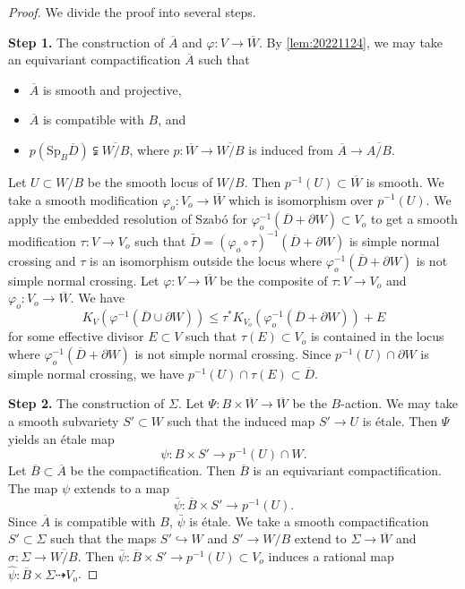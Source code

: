 \documentclass[11pt,english]{smfart}
\theoremstyle{plain}
\theoremstyle{definition}
\theoremstyle{remark}
\numberwithin{equation}{section}
\theoremstyle{plain}
\begin{document}
	\begin{proof}
	We divide the proof into several steps.
	
	\textbf{Step 1.} The construction of $\overline{A}$ and $\varphi: V \to \overline{W}$.
By \cref{lem:20221124}, we may take an equivariant compactification $\overline{A}$ such that
		\begin{itemize}
			\item
			$\overline{A}$ is smooth and projective, 
			\item
			$\overline{A}$ is compatible with $B$, and
			\item $p(\mathrm{Sp}_B\overline{D})\subsetneqq \overline{W/B}$, where $p:\overline{W}\to \overline{W/B}$ is induced from $\overline{A}\to\overline{A/B}$.
		\end{itemize}
		Let $U\subset W/B$ be the smooth locus of $W/B$.
		Then $p^{-1}(U)\subset \overline{W}$ is smooth.
		We take a smooth modification $\varphi_o:V_o\to \overline{W}$ which is isomorphism over $p^{-1}(U)$.
		We apply the embedded resolution of Szab{\'o}  \cite{Sza94} 
		for $\varphi_o^{-1}(\overline{D}+\partial W)\subset V_o$ to get a smooth modification $\tau:V\to V_o$ such that $\widetilde{D}=(\varphi_o\circ \tau)^{-1}(\overline{D}+\partial W)$ is simple normal crossing and $\tau$ is an isomorphism outside the locus where $\varphi_o^{-1}(\overline{D}+\partial W)$ is not simple normal crossing.
		Let $\varphi:V\to \overline{W}$ be the composite of $\tau:V\to V_o$ and $\varphi_o:V_o\to \overline{W}$.
		We have 
		\begin{equation}\label{eqn:20221126}
			K_{V}(\varphi^{-1}(\overline{D}\cup \partial W))
			\leq
			\tau^*K_{V_o}(\varphi_o^{-1}(\overline{D}+\partial W))+E
		\end{equation}
		for some effective divisor $E\subset V$ such that $\tau(E)\subset V_o$ is contained in the locus where $\varphi_o^{-1}(\overline{D}+\partial W)$ is not simple normal crossing.
		Since $p^{-1}(U)\cap \partial W$ is simple normal crossing, we have $p^{-1}(U)\cap \tau(E)\subset \overline{D}$.
		
	\textbf{Step 2.}
	The construction of $\Sigma$.
	Let $\Psi:B\times \overline{W}\to \overline{W}$ be the $B$-action.
		We may take a smooth subvariety $S'\subset W$ such that the induced map $S'\to U$ is {\'e}tale.
		Then $\Psi$ yields an {\'e}tale map 
		$$\psi:B\times S'\to p^{-1}(U)\cap W.$$
		Let $\overline{B}\subset\overline{A}$ be the compactification.
		Then $\overline{B}$ is an equivariant compactification.
		The map $\psi$ extends to a map
		$$
		\bar{\psi}:\overline{B}\times S'\to p^{-1}(U).
		$$ 
		Since $\overline{A}$ is compatible with $B$, $\bar{\psi}$ is {\'e}tale.
		We take a smooth compactification $S'\subset \Sigma$ such that the maps $S'\hookrightarrow W$ and $S'\to W/B$ extend to $\Sigma\to \overline{W}$ and $\sigma:\Sigma\to \overline{W/B}$.
		Then $\bar{\psi}:\overline{B}\times S'\to p^{-1}(U)\subset V_o$ induces a rational map $\widehat{\psi}:\overline{B}\times \Sigma\dashrightarrow V_o$.
		

\end{proof}
\end{document}
